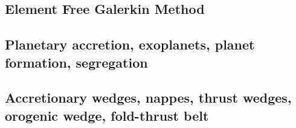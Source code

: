 \subsection{Element Free Galerkin Method}

{\scriptsize
\noindent
\cite{begl94b}
\cite{belg95a}
\cite{belg95b}
\cite{bekf96}\cite{como96}
\cite{bekk97}
\cite{pobe98}\cite{zhat98}
\cite{hans03}\cite{katf04}
\cite{huvv04}
\cite{yiha10}\cite{libe10}
}

\subsection{Planetary accretion, exoplanets, planet formation, segregation}

{\scriptsize
\noindent
\cite{lejm08}
\cite{ligt09}\cite{gogk09}
\cite{vayb10}
\cite{ligt11}\cite{vacg11}
\cite{vagc13}
\cite{gobg14}\cite{yadl14}
\cite{neum19}\cite{vayu19}
}

\subsection{Accretionary wedges, nappes, thrust wedges, orogenic wedge, fold-thrust belt} 

{\scriptsize
\noindent
\cite{stoc83}\cite{dasd83}
\cite{dahl84}\cite{dasd84}
\cite{dahl90}
\cite{koon94}
\cite{wiep03}\cite{smbs03}\cite{muso03}\cite{vamf03}
\cite{simp06}\cite{yabm06}
\cite{rukb12}
\cite{rugb13}
\cite{mauw16}
\cite{mauw17}\cite{rugb17}
\cite{weib18}
\cite{elgb19}\cite{meho19}\cite{meho19b}
\cite{spsk20}\cite{kids20}
}


